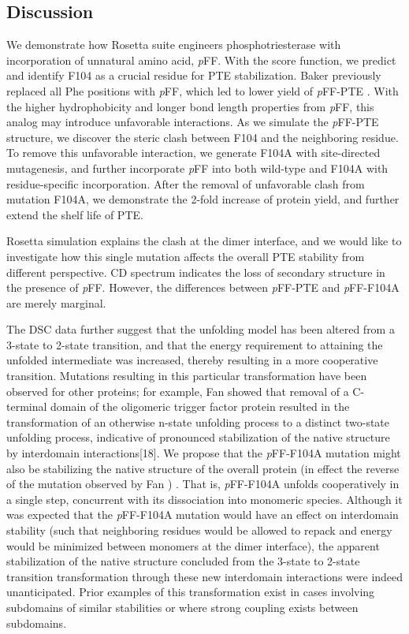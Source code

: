 \begin{refsection}
\section{Discussion}

We demonstrate how Rosetta suite engineers phosphotriesterase with
incorporation of unnatural amino acid, \emph{p}FF. With the score function, we
predict and identify F104 as a crucial residue for PTE stabilization. Baker
 previously replaced all Phe positions with \emph{p}FF, which led
to lower yield of \emph{p}FF-PTE \cite{Baker2011b}. With the higher
hydrophobicity and longer bond length properties from \emph{p}FF, this analog
may introduce unfavorable interactions. As we simulate the \emph{p}FF-PTE
structure, we discover the steric clash between F104 and the neighboring
residue. To remove this unfavorable interaction, we generate F104A with
site-directed mutagenesis, and further incorporate \emph{p}FF into both
wild-type and F104A with residue-specific incorporation. After the removal of
unfavorable clash from mutation F104A, we demonstrate the 2-fold increase of
protein yield, and further extend the shelf life of PTE.

Rosetta simulation explains the clash at the dimer interface, and we would like to
investigate how this single mutation affects the overall PTE stability from
different perspective. CD spectrum indicates the loss of secondary structure in
the presence of \emph{p}FF. However, the differences between \emph{p}FF-PTE and
\emph{p}FF-F104A are merely marginal. 

The DSC data further suggest that the unfolding model has been altered
from a 3-state to 2-state transition, and that the energy requirement to
attaining the unfolded intermediate was increased, thereby resulting in a more
cooperative transition. Mutations resulting in this particular transformation
have been observed for other proteins; for example, Fan  showed
that removal of a C-terminal domain of the oligomeric  trigger
factor protein resulted in the transformation of an otherwise n-state unfolding
process to a distinct two-state unfolding process, indicative of pronounced
stabilization of the native structure by interdomain interactions[18]. We
propose that the \emph{p}FF-F104A mutation might also be stabilizing the native
structure of the overall protein (in effect the reverse of the mutation
observed by Fan ) \cite{Fan2008}. That is, \emph{p}FF-F104A unfolds
cooperatively in a single step, concurrent with its dissociation into monomeric
species. Although it was expected that the \emph{p}FF-F104A mutation would have an
effect on interdomain stability (such that neighboring residues would be
allowed to repack and energy would be minimized between monomers at the dimer
interface), the apparent stabilization of the native structure concluded from
the 3-state to 2-state transition transformation through these new interdomain
interactions were indeed unanticipated. Prior examples of this transformation
exist in cases involving subdomains of similar stabilities or where strong
coupling exists between subdomains\cite{Tsytlonok2013}.


\end{refsection}
